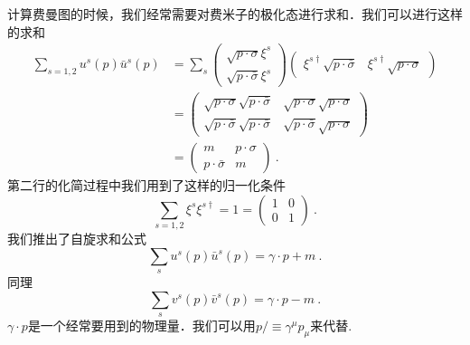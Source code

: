 
计算费曼图的时候，我们经常需要对费米子的极化态进行求和．我们可以进行这样的求和
\begin{align}\nonumber
\sum_{s = 1,2}u^s(p)\bar u^s(p ) & = \sum_s \begin{pmatrix}
\sqrt{p\cdot \sigma}\xi^s \\
\sqrt{p\cdot\bar\sigma} \xi^s
\end{pmatrix}\begin{pmatrix}
\xi^{s\dagger}\sqrt{p\cdot\bar\sigma} & \xi^{s\dagger}\sqrt{p\cdot \sigma}
\end{pmatrix}\\\nonumber
& = \begin{pmatrix}
\sqrt{p\cdot\sigma}\sqrt{p\cdot \bar \sigma} & \sqrt{p\cdot \sigma}\sqrt{p\cdot\sigma} \\
\sqrt{p\cdot\bar\sigma} \sqrt{p\cdot \bar\sigma} & \sqrt{p\cdot\bar\sigma} \sqrt{p\cdot\sigma}
\end{pmatrix} \\
& = \begin{pmatrix}
m & p\cdot \sigma \\
p\cdot \bar \sigma & m
\end{pmatrix}~.
\end{align}
第二行的化简过程中我们用到了这样的归一化条件
\begin{equation}
\sum_{s=1,2}\xi^s\xi^{s\dagger} = 1 = \begin{pmatrix}
1 & 0 \\
0 & 1
\end{pmatrix}~.
\end{equation}
我们推出了自旋求和公式
\begin{equation}
\sum_s u^s(p)\bar u^s(p) = \gamma \cdot p + m ~.
\end{equation}
同理
\begin{equation}
\sum_s v^s(p)\bar v^s(p) = \gamma\cdot p - m ~.
\end{equation}
$\gamma \cdot p$是一个经常要用到的物理量．我们可以用$p\!\!\!/\equiv \gamma^\mu p_\mu$来代替.
